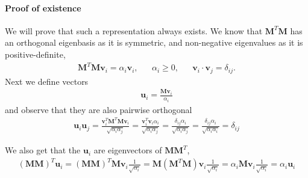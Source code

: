 \paragraph{Proof of existence}
We will prove that such a representation always exists.
We know that $\bm{M}^T \bm{M}$ has an orthogonal eigenbasis as it is symmetric, and non-negative eigenvalues as it is positive-definite,
\begin{align}
    \bm{M}^T \bm{M} \bm{v}_i = \alpha_i \bm{v}_i, && \alpha_i \geq 0, &&  \bm{v}_i \cdot \bm{v}_j = \delta_{ij}.
\end{align}
Next we define vectors 
\begin{align}
\bm{u}_i = \frac{\bm{Mv}_i}{\alpha_i}    
\end{align}
and observe that they are also pairwise orthogonal
\begin{align}
    \bm{u}_i \bm{u}_j = \frac{\bm{v}_i^T \bm{M}^T \bm{Mv}_i}{\sqrt{\alpha_i \alpha_j}} = \frac{\bm{v}_i^T \bm{v}_i \alpha_i}{{\sqrt{\alpha_i \alpha_j}}} = 
    \frac{\delta_{ij} \alpha_i}{{\sqrt{\alpha_i \alpha_j}}} = 
    \frac{\delta_{ij} \alpha_i}{{\sqrt{\alpha_i \alpha_i}}} = \delta_{ij}
\end{align}

We also get that the $\bm{u}_i$ are eigenvectors of $\bm{MM}^T$, 
\begin{align}
     (\bm{M}\bm{M})^T \bm{u}_i
    =(\bm{M}\bm{M})^T \bm{Mv}_i \frac{1}{\sqrt{\alpha_i}} 
    =\bm{M}(\bm{M}^T \bm{M}) \bm{v}_i \frac{1}{\sqrt{\alpha_i}} 
    = \alpha_i \bm{M} \bm{v}_i  \frac{1}{\sqrt{\alpha_i}} 
    = \alpha_i \bm{u}_i
\end{align}


